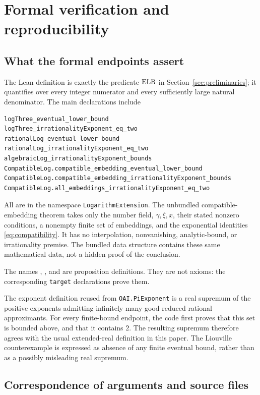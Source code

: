 \section{Formal verification and reproducibility}\label{sec:verification}

\subsection{What the formal endpoints assert}

The Lean definition 
is exactly the predicate \(\operatorname{ELB}\) in
Section~\ref{sec:preliminaries}; it quantifies over every integer
numerator and every sufficiently large natural denominator.
The main declarations include
\begin{Verbatim}[fontsize=\small]
logThree_eventual_lower_bound
logThree_irrationalityExponent_eq_two
rationalLog_eventual_lower_bound
rationalLog_irrationalityExponent_eq_two
algebraicLog_irrationalityExponent_bounds
CompatibleLog.compatible_embedding_eventual_lower_bound
CompatibleLog.compatible_embedding_irrationalityExponent_bounds
CompatibleLog.all_embeddings_irrationalityExponent_eq_two
\end{Verbatim}
All are in the namespace \texttt{LogarithmExtension}.
The unbundled compatible-embedding theorem takes only the number field,
\(\gamma,\xi,x\), their stated nonzero conditions, a nonempty finite
set of embeddings, and the exponential identities
\eqref{eq:compatibility}. It has no interpolation, nonvanishing,
analytic-bound, or irrationality premise.
The bundled data structure  contains these
same mathematical data, not a hidden proof of the conclusion.

The names , ,
and  are proposition definitions.
They are not axioms: the corresponding \texttt{target} declarations
prove them.

The exponent definition reused from \texttt{OAI.PiExponent} is a
real supremum of the positive exponents admitting infinitely many
good reduced rational approximants. For every finite-bound endpoint,
the code first proves that this set is bounded above, and that it
contains \(2\). The resulting supremum therefore agrees with the
usual extended-real definition in this paper.
The Liouville counterexample is expressed as absence of any finite
eventual bound, rather than as a possibly misleading real supremum.

\subsection{Correspondence of arguments and source files}

